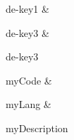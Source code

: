 \hline

de-key1
&

de-key3
&

de-key3
\\
\hline
\hline

myCode
&

myLang
&

myDescription
\\
\hline
